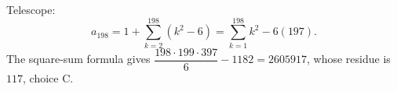 Telescope:
\[a_{198}=1+\sum_{k=2}^{198}(k^2-6)=\sum_{k=1}^{198}k^2-6(197).\]
The square-sum formula gives $\dfrac{198\cdot199\cdot397}{6}-1182=2605917$, whose residue is $\boxed{117}$, choice C.
